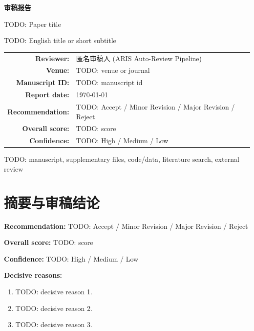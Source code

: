 \documentclass[11pt,a4paper]{article}
\newcommand{\ReportTitle}{审稿报告}
\newcommand{\PaperTitle}{TODO: Paper title}
\newcommand{\PaperSubtitle}{TODO: English title or short subtitle}
\newcommand{\VenueName}{TODO: venue or journal}
\newcommand{\ManuscriptId}{TODO: manuscript id}
\newcommand{\ReviewerName}{匿名审稿人 (ARIS Auto-Review Pipeline)}
\newcommand{\ReportDate}{\today}
\newcommand{\Recommendation}{TODO: Accept / Minor Revision / Major Revision / Reject}
\newcommand{\OverallScore}{TODO: score}
\newcommand{\ReviewConfidence}{TODO: High / Medium / Low}
\newcommand{\ReviewScope}{TODO: manuscript, supplementary files, code/data, literature search, external review}
\begin{document}
\begin{titlepage}
\vspace*{-1.0cm}
\begin{tcolorbox}[colback=blue!5,colframe=blue!60!black,arc=2mm,boxrule=0.6pt]
\centering
{\LARGE\bfseries \ReportTitle\par}
\vspace{0.5em}
{\large \PaperTitle\par}
\vspace{0.3em}
{\normalsize \PaperSubtitle\par}
\end{tcolorbox}

\vspace{1.2em}
\begin{center}
\begin{tabular}{rl}
\textbf{Reviewer:} & \ReviewerName \\
\textbf{Venue:} & \VenueName \\
\textbf{Manuscript ID:} & \ManuscriptId \\
\textbf{Report date:} & \ReportDate \\
\textbf{Recommendation:} & \Recommendation \\
\textbf{Overall score:} & \OverallScore \\
\textbf{Confidence:} & \ReviewConfidence \\
\end{tabular}
\end{center}

\vfill
\begin{summarybox}
\ReviewScope
\end{summarybox}
\end{titlepage}

\tableofcontents
\newpage

\section{摘要与审稿结论}

\begin{abstract}
\noindent
TODO: Summarize the manuscript, review scope, evidence base, decisive strengths and weaknesses, final recommendation, and confidence in 1--3 paragraphs.
\end{abstract}

\begin{criticalbox}
\textbf{Recommendation:} \Recommendation

\textbf{Overall score:} \OverallScore

\textbf{Confidence:} \ReviewConfidence

\textbf{Decisive reasons:}
\begin{enumerate}
  \item TODO: decisive reason 1.
  \item TODO: decisive reason 2.
  \item TODO: decisive reason 3.
\end{enumerate}
\end{criticalbox}
\end{document}
